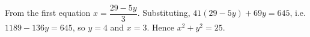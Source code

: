 From the first equation $x=\dfrac{29-5y}{3}$. Substituting, $41(29-5y)+69y=645$, i.e. $1189-136y=645$, so $y=4$ and $x=3$. Hence $x^2+y^2=\boxed{25}$.
